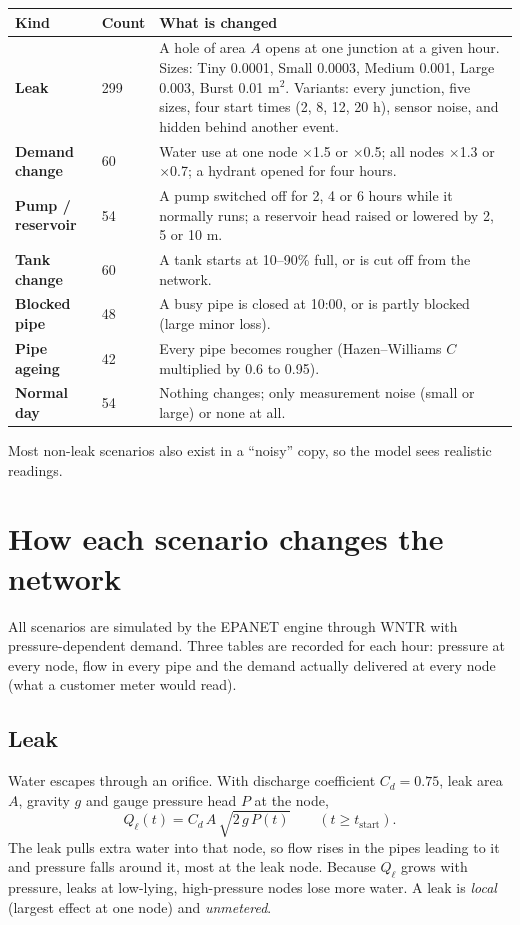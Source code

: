 \documentclass[11pt,a4paper]{article}
\begin{document}
\begin{center}\small
\begin{tabularx}{\linewidth}{@{}>{\bfseries}p{2.8cm}p{1.5cm}Y@{}}
\toprule
Kind & Count & What is changed \\
\midrule
Leak & 299 & A hole of area $A$ opens at one junction at a given hour. Sizes: Tiny 0.0001, Small 0.0003, Medium 0.001, Large 0.003, Burst 0.01 m$^2$. Variants: every junction, five sizes, four start times (2, 8, 12, 20 h), sensor noise, and hidden behind another event. \\
Demand change & 60 & Water use at one node $\times$1.5 or $\times$0.5; all nodes $\times$1.3 or $\times$0.7; a hydrant opened for four hours. \\
Pump / reservoir & 54 & A pump switched off for 2, 4 or 6 hours while it normally runs; a reservoir head raised or lowered by 2, 5 or 10 m. \\
Tank change & 60 & A tank starts at 10--90\% full, or is cut off from the network. \\
Blocked pipe & 48 & A busy pipe is closed at 10:00, or is partly blocked (large minor loss). \\
Pipe ageing & 42 & Every pipe becomes rougher (Hazen--Williams $C$ multiplied by 0.6 to 0.95). \\
Normal day & 54 & Nothing changes; only measurement noise (small or large) or none at all. \\
\bottomrule
\end{tabularx}
\end{center}
Most non-leak scenarios also exist in a ``noisy'' copy, so the model sees realistic readings.

\section{How each scenario changes the network}
All scenarios are simulated by the EPANET engine through WNTR with pressure-dependent demand. Three tables are recorded for each hour: pressure at every node, flow in every pipe and the demand actually delivered at every node (what a customer meter would read).

\subsection{Leak}
Water escapes through an orifice. With discharge coefficient $C_d=0.75$, leak area $A$, gravity $g$ and gauge pressure head $P$ at the node,
\begin{equation}\label{eq:leak}
Q_\ell(t)=C_d\,A\,\sqrt{2\,g\,P(t)}\qquad (t\ge t_{\text{start}}).
\end{equation}
The leak pulls extra water into that node, so flow rises in the pipes leading to it and pressure falls around it, most at the leak node. Because $Q_\ell$ grows with pressure, leaks at low-lying, high-pressure nodes lose more water. A leak is \emph{local} (largest effect at one node) and \emph{unmetered}.
\end{document}
